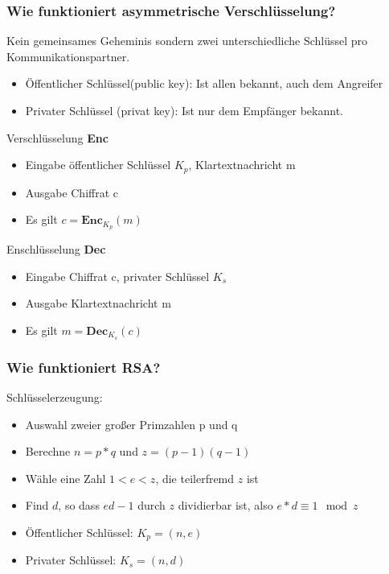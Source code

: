 	\subsubsection{Wie funktioniert asymmetrische Verschlüsselung?}
	Kein gemeinsames Geheminis sondern zwei unterschiedliche Schlüssel pro Kommunikationspartner. 
	\begin{itemize}
		\item Öffentlicher Schlüssel(public key): Ist allen bekannt, auch dem Angreifer
		\item Privater Schlüssel (privat key): Ist nur dem Empfänger bekannt. 
	\end{itemize}
	
	Verschlüsselung \textbf{Enc}
		\begin{itemize}
			\item Eingabe öffentlicher Schlüssel $K_p$, Klartextnachricht m
			\item Ausgabe Chiffrat c
			\item Es gilt $c=\textbf{Enc}_{K_p}(m)$
		\end{itemize}
		
	Enschlüsselung \textbf{Dec}
		\begin{itemize}
			\item Eingabe Chiffrat c, privater Schlüssel $K_s$
			\item Ausgabe Klartextnachricht m
			\item Es gilt $m=\textbf{Dec}_{K_s}(c)$
		\end{itemize}
		
	\subsubsection{Wie funktioniert RSA?}
	Schlüsselerzeugung:	
	\begin{itemize}
		\item Auswahl zweier großer Primzahlen p und q
		\item Berechne $n = p*q$ und $z=(p-1)(q-1)$
		\item Wähle eine Zahl $1<e<z$, die teilerfremd $z$ ist
		\item Find $d$, so dass $ed -1$ durch $z$ dividierbar ist, also $e*d \equiv 1 \mod z$
		\item Öffentlicher Schlüssel: $K_p = (n,e)$
		\item Privater Schlüssel: $K_s = (n,d)$
	\end{itemize}
	
